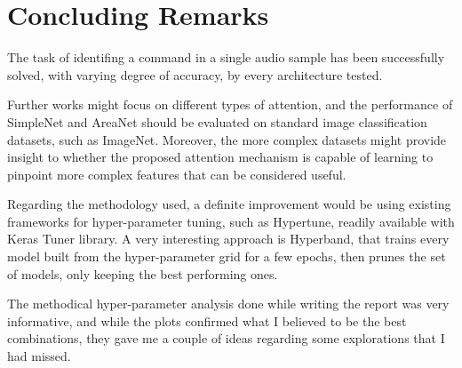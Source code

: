 
\section{Concluding Remarks}
\label{sec:conclusions}


The task of identifing a command in a single audio sample has been successfully
solved, with varying degree of accuracy, by every architecture tested.

Further works might focus on different types of attention, and the performance
of SimpleNet and AreaNet should be evaluated on standard image classification
datasets, such as ImageNet.
%
Moreover, the more complex datasets might provide insight to whether the
proposed attention mechanism is capable of learning to pinpoint more complex
features that can be considered useful.

Regarding the methodology used, a definite improvement would be using existing
frameworks for hyper-parameter tuning, such as Hypertune, readily available
with Keras Tuner library. A very interesting approach is Hyperband, that trains
every model built from the hyper-parameter grid for a few epochs, then prunes
the set of models, only keeping the best performing ones.

The methodical hyper-parameter analysis done while writing the report was very
informative, and while the plots confirmed what I believed to be the best
combinations, they gave me a couple of ideas regarding some explorations that I
had missed.

